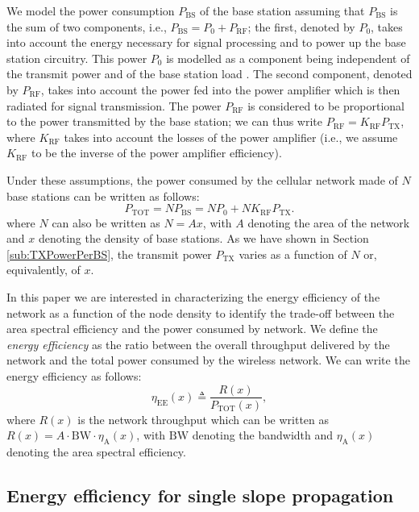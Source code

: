 \documentclass[twocoumn]{IEEEtran}
\begin{document}
We model the power consumption $P_{\mathrm{BS}}$ of the base station
assuming that $P_{\mathrm{BS}}$ is the sum of two components, i.e.,
$P_{\mathrm{BS}}=P_{0}+P_{\mathrm{RF}}$; the first, denoted by $P_{0}$,
takes into account the energy necessary for signal processing and
to power up the base station circuitry. This power $P_{0}$ is modelled
as a component being independent of the transmit power and of the
base station load \cite{Auer2011}. The second component, denoted
by $P_{\mathrm{RF}}$, takes into account the power fed into the power
amplifier which is then radiated for signal transmission. The power
$P_{\mathrm{RF}}$ is considered to be proportional to the power transmitted
by the base station; we can thus write  $P_{\mathrm{RF}}=K_{\mathrm{RF}}P_{\mathrm{TX}}$,
where $K_{\mathrm{RF}}$ takes into account the losses of the power
amplifier (i.e., we assume $K_{\mathrm{RF}}$ to be the inverse of the power amplifier efficiency). 

Under these assumptions, the power consumed by the cellular network
made of $N$ base stations can be written as follows: 
\begin{equation}
P_{\mathrm{TOT}}=NP_{\mathrm{BS}}=NP_{0}+NK_{\mathrm{RF}}P_{\mathrm{TX}}.
\end{equation}
where $N$ can also be written as $N=Ax$, with $A$ denoting the area
of the network and $x$ denoting the density of base stations. As we
have shown in Section \ref{sub:TXPowerPerBS}, the transmit power
$P_{\mathrm{TX}}$ varies as a function of $N$ or, equivalently, of $x$.

In this paper we are interested in characterizing the energy efficiency
of the network as a function of the node density to identify
the trade-off between the area spectral efficiency and the power consumed
by network. We define the \textit{energy efficiency} as the ratio
between the overall throughput delivered by the network and the total
power consumed by the wireless network. We can write the energy efficiency
as follows: 
\begin{equation}
\eta_{\mathrm{EE}}(x)\triangleq\frac{R(x)}{P_{\mathrm{TOT}}(x)},\label{eq:eff_definition}
\end{equation}
where $R(x)$ is the network throughput which can be written as $R(x)= A\cdot\mathrm{BW}\cdot \eta_{\mathrm{A}}(x)$,
with \textbf{$\mathrm{BW}$} denoting the bandwidth and $\eta_{\mathrm{A}}(x)$ denoting the area spectral efficiency.


\subsection{Energy efficiency for single slope propagation} \label{sub:Energy_efficiency_for_LOS}
\end{document}
